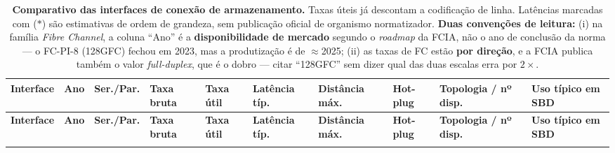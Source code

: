 \documentclass[11pt,a4paper]{article}
\renewcommand{\arraystretch}{1.18}
\begin{document}
\begin{landscape}
\thispagestyle{empty}
{\scriptsize
\setlength{\tabcolsep}{3.5pt}
\renewcommand{\arraystretch}{1.0}
\begin{longtable}{@{}>{\RaggedRight\arraybackslash}p{2.75cm}>{\RaggedRight\arraybackslash}p{1.1cm}>{\RaggedRight\arraybackslash}p{1.15cm}>{\RaggedRight\arraybackslash}p{2.05cm}>{\RaggedRight\arraybackslash}p{2.15cm}>{\RaggedRight\arraybackslash}p{1.85cm}>{\RaggedRight\arraybackslash}p{1.9cm}>{\RaggedRight\arraybackslash}p{1.1cm}>{\RaggedRight\arraybackslash}p{2.55cm}>{\RaggedRight\arraybackslash}p{2.95cm}@{}}
\caption{\textbf{Comparativo das interfaces de conexão de armazenamento.} Taxas úteis já
descontam a codificação de linha. Latências marcadas com ($\ast$) são estimativas de ordem
de grandeza, sem publicação oficial de organismo normatizador. \textbf{Duas convenções de
leitura:} (i) na família \emph{Fibre Channel}, a coluna ``Ano'' é a \textbf{disponibilidade de
mercado} segundo o \emph{roadmap} da FCIA, não o ano de conclusão da norma --- o FC-PI-8
(128GFC) fechou em 2023, mas a produtização é de $\approx$2025; (ii) as taxas de FC estão
\textbf{por direção}, e a FCIA publica também o valor \emph{full-duplex}, que é o dobro --- citar
``128GFC'' sem dizer qual das duas escalas erra por $2\times$.}\label{tab:if}\\
\toprule
\textbf{Interface} & \textbf{Ano} & \textbf{Ser./Par.} & \textbf{Taxa bruta} &
\textbf{Taxa útil} & \textbf{Latência típ.} & \textbf{Distância máx.} &
\textbf{Hot-plug} & \textbf{Topologia / nº disp.} & \textbf{Uso típico em SBD} \\
\midrule
\endfirsthead
\toprule
\textbf{Interface} & \textbf{Ano} & \textbf{Ser./Par.} & \textbf{Taxa bruta} &
\textbf{Taxa útil} & \textbf{Latência típ.} & \textbf{Distância máx.} &
\textbf{Hot-plug} & \textbf{Topologia / nº disp.} & \textbf{Uso típico em SBD} \\
\midrule
\endhead
\bottomrule
\endfoot


\end{longtable}}
\end{landscape}
\end{document}
